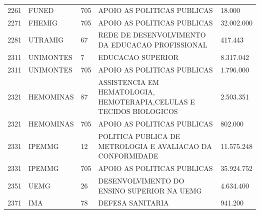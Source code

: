 \documentclass{article}
\begin{document}
\begin{longtable}[c]{m{1cm}|m{1.5cm}|m{1cm}m{10cm}|m{2cm}}
\multicolumn{1}{C{1cm}|}{2261} & \multicolumn{1}{L{1.5cm}|}{FUNED} & \multicolumn{1}{C{1cm}|}{705} & \multicolumn{1}{L{10cm}|}{APOIO AS POLITICAS PUBLICAS} & \multicolumn{1}{R{2cm}}{18.000} \\
\multicolumn{1}{C{1cm}|}{2271} & \multicolumn{1}{L{1.5cm}|}{FHEMIG} & \multicolumn{1}{C{1cm}|}{705} & \multicolumn{1}{L{10cm}|}{APOIO AS POLITICAS PUBLICAS} & \multicolumn{1}{R{2cm}}{32.002.000} \\
\multicolumn{1}{C{1cm}|}{2281} & \multicolumn{1}{L{1.5cm}|}{UTRAMIG} & \multicolumn{1}{C{1cm}|}{67} & \multicolumn{1}{L{10cm}|}{REDE DE DESENVOLVIMENTO DA EDUCACAO PROFISSIONAL} & \multicolumn{1}{R{2cm}}{417.443} \\
\multicolumn{1}{C{1cm}|}{2311} & \multicolumn{1}{L{1.5cm}|}{UNIMONTES} & \multicolumn{1}{C{1cm}|}{7} & \multicolumn{1}{L{10cm}|}{EDUCACAO SUPERIOR} & \multicolumn{1}{R{2cm}}{8.317.042} \\
\multicolumn{1}{C{1cm}|}{2311} & \multicolumn{1}{L{1.5cm}|}{UNIMONTES} & \multicolumn{1}{C{1cm}|}{705} & \multicolumn{1}{L{10cm}|}{APOIO AS POLITICAS PUBLICAS} & \multicolumn{1}{R{2cm}}{1.796.000} \\
\multicolumn{1}{C{1cm}|}{2321} & \multicolumn{1}{L{1.5cm}|}{HEMOMINAS} & \multicolumn{1}{C{1cm}|}{87} & \multicolumn{1}{L{10cm}|}{ASSISTENCIA EM HEMATOLOGIA, HEMOTERAPIA,CELULAS E TECIDOS BIOLOGICOS} & \multicolumn{1}{R{2cm}}{2.503.351} \\
\multicolumn{1}{C{1cm}|}{2321} & \multicolumn{1}{L{1.5cm}|}{HEMOMINAS} & \multicolumn{1}{C{1cm}|}{705} & \multicolumn{1}{L{10cm}|}{APOIO AS POLITICAS PUBLICAS} & \multicolumn{1}{R{2cm}}{802.000} \\
\multicolumn{1}{C{1cm}|}{2331} & \multicolumn{1}{L{1.5cm}|}{IPEMMG} & \multicolumn{1}{C{1cm}|}{12} & \multicolumn{1}{L{10cm}|}{POLITICA PUBLICA DE METROLOGIA E AVALIACAO DA CONFORMIDADE} & \multicolumn{1}{R{2cm}}{11.575.248} \\
\multicolumn{1}{C{1cm}|}{2331} & \multicolumn{1}{L{1.5cm}|}{IPEMMG} & \multicolumn{1}{C{1cm}|}{705} & \multicolumn{1}{L{10cm}|}{APOIO AS POLITICAS PUBLICAS} & \multicolumn{1}{R{2cm}}{35.924.752} \\
\multicolumn{1}{C{1cm}|}{2351} & \multicolumn{1}{L{1.5cm}|}{UEMG} & \multicolumn{1}{C{1cm}|}{26} & \multicolumn{1}{L{10cm}|}{DESENVOLVIMENTO DO ENSINO SUPERIOR NA UEMG} & \multicolumn{1}{R{2cm}}{4.634.400} \\
\multicolumn{1}{C{1cm}|}{2371} & \multicolumn{1}{L{1.5cm}|}{IMA} & \multicolumn{1}{C{1cm}|}{78} & \multicolumn{1}{L{10cm}|}{DEFESA SANITARIA} & \multicolumn{1}{R{2cm}}{941.200} \\

\end{longtable}
\end{document}
